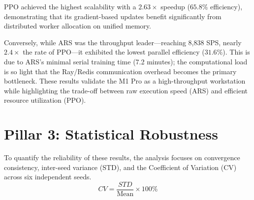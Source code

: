 PPO achieved the highest scalability with a $2.63\times$ speedup ($65.8\%$ efficiency), demonstrating that its gradient-based updates benefit significantly from distributed worker allocation on unified memory. 

Conversely, while ARS was the throughput leader---reaching 8,838 SPS, nearly $2.4\times$ the rate of PPO---it exhibited the lowest parallel efficiency ($31.6\%$). This is due to ARS's minimal serial training time (7.2 minutes); the computational load is so light that the Ray/Redis communication overhead becomes the primary bottleneck. These results validate the M1 Pro as a high-throughput workstation while highlighting the trade-off between raw execution speed (ARS) and efficient resource utilization (PPO).

\section{Pillar 3: Statistical Robustness}
To quantify the reliability of these results, the analysis focuses on convergence consistency, inter-seed variance (STD), and the Coefficient of Variation (CV) across six independent seeds. 
\begin{equation}
    CV = \frac{STD}{\text{Mean}} \times 100\%
\end{equation}

